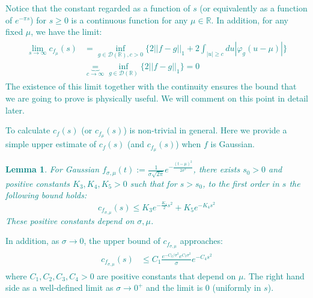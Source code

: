 \documentclass[a4paper,11pt]{article}
\newtheorem{lemma}[theorem]{Lemma}
\theoremstyle{definition}
\newcommand{\YC}[1]{\textcolor{teal}{#1}}
\begin{document}
\YC{
Notice that the constant regarded as a function of $s$ (or equivalently as a function of $e^{-\pi s}$) for $s\geq 0$ is a continuous function for any $\mu \in\mathbb{R}$. In addition, for any fixed $\mu$, we have the limit:
\begin{align}
    \begin{split}
        \lim_{s\rightarrow\infty}c_{f_\mu}(s) &= \inf_{g\in\mathcal{D}(\mathbb{R}),c>0}\{2||f-g||_1 + 2\int_{|u|\geq c}du |\varphi_g(u - \mu)|\}\\&
        \underbrace{=}_{c\rightarrow\infty}\inf_{g\in\mathcal{D}(\mathbb{R})}\{2||f-g||_1\} = 0
    \end{split} 
\end{align}
The existence of this limit together with the continuity ensures the bound that we are going to prove is physically useful. We will comment on this point in detail later.
}

\YC{
To calculate $c_f(s)$ (or $c_{f_\mu}(s)$) is non-trivial in general. Here we provide a simple upper estimate of $c_f(s)$ (and $c_{f_\mu}(s)$) when $f$ is Gaussian.
\begin{lemma}
    For Gaussian $f_{\sigma,\mu}(t) := \frac{1}{\sigma\sqrt{2\pi}}e^{-\frac{(t - \mu)^2}{2\sigma^2}}$, there exists $s_0 > 0$ and positive constants $K_3, K_4, K_5 > 0$ such that for $s > s_0$, to the first order in $s$ the following bound holds:
    \begin{equation}
        c_{f_{\sigma,\mu}}(s) \leq K_3e^{-\frac{K_4}{2}s^2} + K_5e^{-K_4 s^2}
    \end{equation}
    These positive constants depend on $\sigma,\mu$.
\end{lemma}
In addition, as $\sigma \rightarrow 0$, the upper bound of $c_{f_{\sigma, \mu}}$ approaches:
\begin{align}
    \begin{split}
        c_{f_{\sigma,\mu}}(s) &\leq C_1 \frac{e^{-C_2/\sigma^2}e^{C_3\sigma^2}}{\sigma}e^{-C_4s^2}
    \end{split}
\end{align}
where $C_1,C_2,C_3, C_4 > 0$ are positive constants that depend on $\mu$. The right hand side as a well-defined limit as $\sigma\rightarrow 0^+$ and the limit is $0$ (uniformly in $s$).
}
\end{document}
